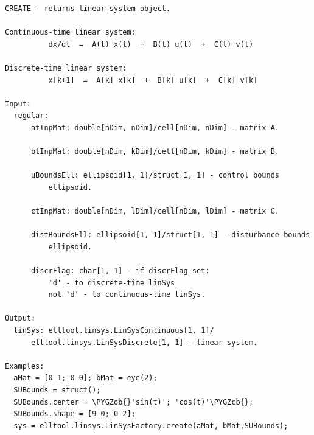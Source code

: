 \documentclass[letterpaper,10pt,english]{sphinxmanual}
\def\PYGZob{\char`\{}
\def\PYGZcb{\char`\}}
\begin{document}
\begin{Verbatim}[commandchars=\\\{\}]
CREATE - returns linear system object.

Continuous-time linear system:
          dx/dt  =  A(t) x(t)  +  B(t) u(t)  +  C(t) v(t)

Discrete-time linear system:
          x[k+1]  =  A[k] x[k]  +  B[k] u[k]  +  C[k] v[k]

Input:
  regular:
      atInpMat: double[nDim, nDim]/cell[nDim, nDim] - matrix A.

      btInpMat: double[nDim, kDim]/cell[nDim, kDim] - matrix B.

      uBoundsEll: ellipsoid[1, 1]/struct[1, 1] - control bounds
          ellipsoid.

      ctInpMat: double[nDim, lDim]/cell[nDim, lDim] - matrix G.

      distBoundsEll: ellipsoid[1, 1]/struct[1, 1] - disturbance bounds
          ellipsoid.

      discrFlag: char[1, 1] - if discrFlag set:
          'd' - to discrete-time linSys
          not 'd' - to continuous-time linSys.

Output:
  linSys: elltool.linsys.LinSysContinuous[1, 1]/
      elltool.linsys.LinSysDiscrete[1, 1] - linear system.

Examples:
  aMat = [0 1; 0 0]; bMat = eye(2);
  SUBounds = struct();
  SUBounds.center = \PYGZob{}'sin(t)'; 'cos(t)'\PYGZcb{};
  SUBounds.shape = [9 0; 0 2];
  sys = elltool.linsys.LinSysFactory.create(aMat, bMat,SUBounds);
\end{Verbatim}
\end{document}
